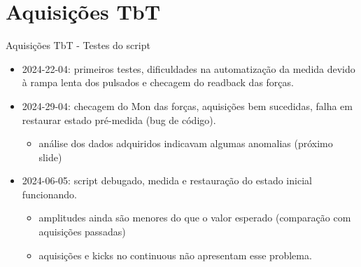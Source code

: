 \documentclass[aspectratio=169]{beamer}            %
\begin{document}
\section{Aquisições TbT}

\begin{frame}{Aquisições TbT - Testes do script}
    \begin{itemize}
        \setlength\itemsep{1em}
        \item 2024-22-04: primeiros testes, dificuldades na automatização da medida devido à rampa lenta dos pulsados e checagem do readback das forças.
        \item 2024-29-04: checagem do Mon das forças, aquisições bem sucedidas, falha em restaurar estado pré-medida (bug de código). 
        \begin{itemize}
            \item análise dos dados adquiridos indicavam algumas anomalias (próximo slide)
        \end{itemize}
        \item 2024-06-05: script debugado, medida e restauração do estado inicial funcionando. 
         \begin{itemize}
            \item amplitudes ainda são menores do que o valor esperado (comparação com aquisições passadas)
            \item aquisições e kicks no continuous não apresentam esse problema.
        \end{itemize}
    \end{itemize}
\end{frame}
\end{document}
